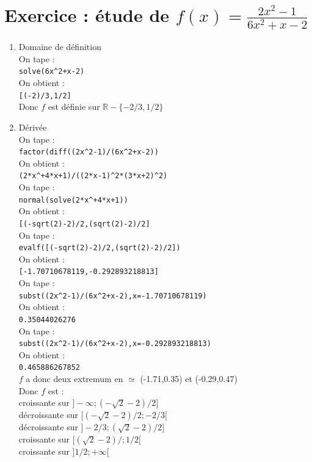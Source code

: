 \documentclass[a4paper,11pt]{book}
\newcommand{\R}{{\mathbb{R}}}
\begin{document}
\section{Exercice : \'etude de $\displaystyle f(x)=\frac{2x^2-1}{6x^2+x-2}$}
\begin{enumerate}
\item Domaine de d\'efinition\\
On tape :\\
{\tt solve(6x\verb|^|2+x-2)}\\
On obtient :\\
{\tt [(-2)/3,1/2]}\\
Donc $f$ est d\'efinie sur $\R-\{-2/3,1/2\}$
\item D\'eriv\'ee\\
On tape :\\
{\tt factor(diff((2x\verb|^|2-1)/(6x\verb|^|2+x-2))}\\
On obtient :\\
{\tt (2*x\verb|^|+4*x+1)/((2*x-1)\verb|^|2*(3*x+2)\verb|^|2)}\\
On tape :\\
{\tt normal(solve(2*x\verb|^|+4*x+1))}\\
On obtient :\\
{\tt [(-sqrt(2)-2)/2,(sqrt(2)-2)/2]}\\
On tape :\\
{\tt evalf([(-sqrt(2)-2)/2,(sqrt(2)-2)/2])}\\
On obtient :\\
{\tt [-1.70710678119,-0.292893218813]}\\
On tape :\\
{\tt subst((2x\verb|^|2-1)/(6x\verb|^|2+x-2),x=-1.70710678119)}\\
On obtient :\\
{\tt 0.35044026276}\\
On tape :\\
{\tt subst((2x\verb|^|2-1)/(6x\verb|^|2+x-2),x=-0.292893218813)}\\
On obtient :\\
{\tt 0.465886267852}\\
$f$ a donc deux extremum en $\simeq$ (-1.71,0.35) et (-0.29,0.47)\\
Donc $f$ est :\\
croissante sur $]-\infty;(-\sqrt 2-2)/2]$\\
d\'ecroissante sur $[(-\sqrt 2-2)/2; -2/3[$\\
d\'ecroissante sur $]-2/3;(\sqrt 2-2)/2]$\\
croissante sur $[(\sqrt 2-2)/;1/2[$\\
croissante sur $]1/2;+\infty[$


\end{enumerate}
\end{document}
